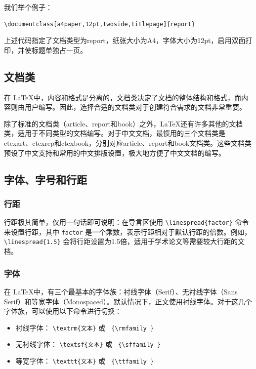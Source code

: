 我们举个例子：
\begin{verbatim}
\documentclass[a4paper,12pt,twoside,titlepage]{report}
\end{verbatim}
上述代码指定了文档类型为report，纸张大小为A4，字体大小为12pt，启用双面打印，并使标题单独占一页。

\subsection{文档类}

在 \LaTeX 中，内容和格式是分离的，文档类决定了文档的整体结构和格式，而内容则由用户编写。因此，选择合适的文档类对于创建符合需求的文档非常重要。

除了标准的文档类（article、report和book）之外，\LaTeX 还有许多其他的文档类，适用于不同类型的文档编写。对于中文文档，最惯用的三个文档类是ctexart、ctexrep和ctexbook，分别对应article、report和book文档类。这些文档类预设了中文支持和常用的中文排版设置，极大地方便了中文文档的编写。

\subsection{字体、字号和行距}

\subsubsection{行距}

行距极其简单，仅用一句话即可说明：在导言区使用 \verb|\linespread{factor}| 命令来设置行距，其中 \verb|factor| 是一个乘数，表示行距相对于默认行距的倍数。例如， \verb|\linespread{1.5}| 会将行距设置为1.5倍，适用于学术论文等需要较大行距的文档。

\subsubsection{字体}

在 \LaTeX 中，有三个最基本的字体族：衬线字体（Serif）、无衬线字体（Sans Serif）和等宽字体（Monospaced）。默认情况下，正文使用衬线字体。对于这几个字体族，可以使用以下命令进行切换：
\begin{itemize}
  \item 衬线字体： \verb|\textrm{文本}| 或 \verb| {\rmfamily }|
  \item 无衬线字体： \verb|\textsf{文本}| 或 \verb| {\sffamily }|
  \item 等宽字体： \verb|\texttt{文本}| 或 \verb| {\ttfamily }|
\end{itemize}

